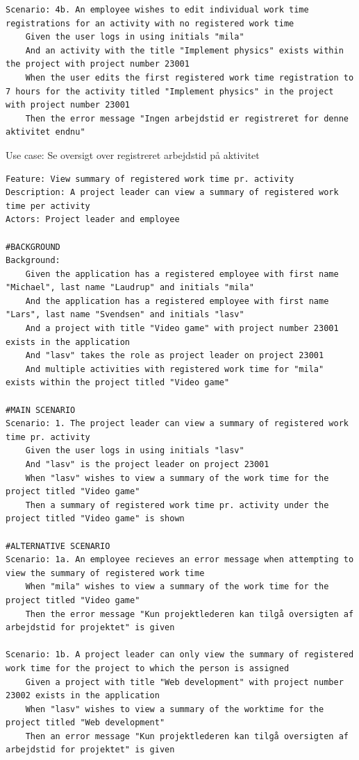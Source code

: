 \begin{listing}[H]
\begin{verbatim}
Scenario: 4b. An employee wishes to edit individual work time registrations for an activity with no registered work time
    Given the user logs in using initials "mila"
    And an activity with the title "Implement physics" exists within the project with project number 23001
    When the user edits the first registered work time registration to 7 hours for the activity titled "Implement physics" in the project with project number 23001
    Then the error message "Ingen arbejdstid er registreret for denne aktivitet endnu"
    \end{verbatim}
\end{listing}
\begin{listing}
    \centering
    \caption{Use case: Se oversigt over registreret arbejdstid på aktivitet}\label{lst:usecase_oversigt_over_registreret_arbejdstid_pr_aktivitet}
    \begin{verbatim}  
Feature: View summary of registered work time pr. activity
Description: A project leader can view a summary of registered work time per activity
Actors: Project leader and employee

#BACKGROUND
Background:
    Given the application has a registered employee with first name "Michael", last name "Laudrup" and initials "mila"
    And the application has a registered employee with first name "Lars", last name "Svendsen" and initials "lasv"
    And a project with title "Video game" with project number 23001 exists in the application
    And "lasv" takes the role as project leader on project 23001
    And multiple activities with registered work time for "mila" exists within the project titled "Video game"

#MAIN SCENARIO
Scenario: 1. The project leader can view a summary of registered work time pr. activity
    Given the user logs in using initials "lasv"
    And "lasv" is the project leader on project 23001
    When "lasv" wishes to view a summary of the work time for the project titled "Video game"
    Then a summary of registered work time pr. activity under the project titled "Video game" is shown

#ALTERNATIVE SCENARIO
Scenario: 1a. An employee recieves an error message when attempting to view the summary of registered work time
    When "mila" wishes to view a summary of the work time for the project titled "Video game"
    Then the error message "Kun projektlederen kan tilgå oversigten af arbejdstid for projektet" is given

Scenario: 1b. A project leader can only view the summary of registered work time for the project to which the person is assigned
    Given a project with title "Web development" with project number 23002 exists in the application
    When "lasv" wishes to view a summary of the worktime for the project titled "Web development"
    Then an error message "Kun projektlederen kan tilgå oversigten af arbejdstid for projektet" is given


\end{verbatim}
\end{listing}
